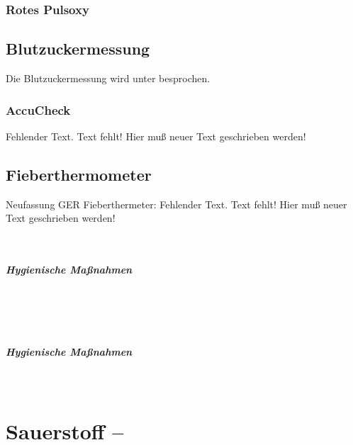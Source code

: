 \subsubsection{Rotes Pulsoxy}


\subsection{Blutzuckermessung}

Die Blutzuckermessung wird unter
 besprochen.

\subsubsection{AccuCheck}
\begin{anfxerror}[author=GABS]{Fehlender Text.}
  Text fehlt! Hier muß neuer Text geschrieben werden!
\end{anfxerror}

\subsection{Fieberthermometer}

\begin{anfxerror}[author=GABS]{Neufassung GER Fieberthermeter: Fehlender Text.}
  Text fehlt! Hier muß neuer Text geschrieben werden!
\end{anfxerror}

{~

\TakeNotesLarge

\subparagraph{Hygienische Maßnahmen}~

\TakeNotesMedium
}{}{}{}{}

{~

\TakeNotesLarge

\subparagraph{Hygienische Maßnahmen}~

\TakeNotesMedium
}{}{}{}{}




\section{Sauerstoff -- }
\label{topic:sauerstoff}\label{topic:o2}



